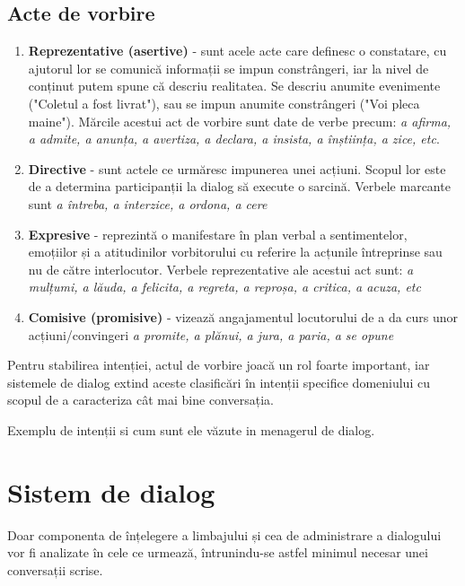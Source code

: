 \subsection{Acte de vorbire}
\begin{enumerate}
	\item \textbf{Reprezentative (asertive)} - sunt acele acte care definesc o constatare, cu ajutorul lor se comunică informații se impun constrângeri, iar la nivel de conținut putem spune că descriu realitatea. Se descriu anumite evenimente ("Coletul a fost livrat"), sau se impun anumite constrângeri ("Voi pleca maine"). Mărcile acestui act de vorbire sunt date de verbe precum: \textit{a afirma, a admite, a anunța, a avertiza, a declara, a insista, a înștiința, a zice, etc}.

	\item \textbf{Directive} - sunt actele ce urmăresc impunerea unei acțiuni. Scopul lor este de a determina participanții la dialog să execute o sarcină. Verbele marcante sunt \textit{a întreba, a interzice, a ordona, a cere}
	
	\item \textbf{Expresive} -  reprezintă o manifestare în plan verbal a sentimentelor, emoțiilor și a atitudinilor vorbitorului cu referire la acțunile întreprinse sau nu de către interlocutor. Verbele reprezentative ale acestui act sunt: \textit{a mulțumi, a lăuda, a felicita, a regreta, a reproșa, a critica, a acuza, etc}
	
	\item \textbf{Comisive (promisive)} - vizează angajamentul locutorului de a da curs unor acțiuni/convingeri \textit{a promite, a plănui, a jura, a paria, a se opune}
\end{enumerate}

Pentru stabilirea intenției, actul de vorbire joacă un rol foarte important, iar sistemele de dialog extind aceste clasificări în intenții specifice domeniului cu scopul de a caracteriza cât mai bine conversația.

Exemplu de intenții si cum sunt ele văzute in menagerul de dialog.

\section{Sistem de dialog}

Doar componenta de înțelegere a limbajului și cea de administrare a dialogului vor fi analizate în cele ce urmează, întrunindu-se astfel minimul necesar unei conversații scrise.

